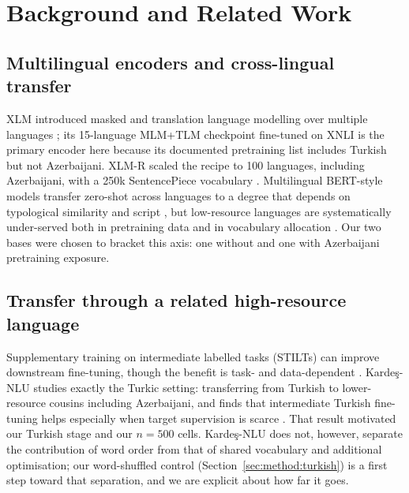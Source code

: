 \section{Background and Related Work}
\label{sec:related}

\subsection{Multilingual encoders and cross-lingual transfer}
XLM introduced masked and translation language modelling over multiple languages \cite{lample2019xlm}; its 15-language MLM+TLM checkpoint fine-tuned on XNLI \cite{conneau2018xnli} is the primary encoder here because its documented pretraining list includes Turkish but not Azerbaijani. XLM-R scaled the recipe to 100 languages, including Azerbaijani, with a 250k SentencePiece vocabulary \cite{conneau2020xlmr,kudo2018sentencepiece}. Multilingual BERT-style models transfer zero-shot across languages to a degree that depends on typological similarity and script \cite{pires2019multilingual,artetxe2020crosslingual}, but low-resource languages are systematically under-served both in pretraining data and in vocabulary allocation \cite{wu2020alllanguages}. Our two bases were chosen to bracket this axis: one without and one with Azerbaijani pretraining exposure.

\subsection{Transfer through a related high-resource language}
Supplementary training on intermediate labelled tasks (STILTs) can improve downstream fine-tuning, though the benefit is task- and data-dependent \cite{phang2018stilts,pruksachatkun2020intermediate}. Kardeş-NLU studies exactly the Turkic setting: transferring from Turkish to lower-resource cousins including Azerbaijani, and finds that intermediate Turkish fine-tuning helps especially when target supervision is scarce \cite{senel2024kardes}. That result motivated our Turkish stage and our $n=500$ cells. Kardeş-NLU does not, however, separate the contribution of word order from that of shared vocabulary and additional optimisation; our word-shuffled control (Section~\ref{sec:method:turkish}) is a first step toward that separation, and we are explicit about how far it goes.

